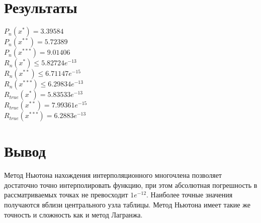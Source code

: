 \documentclass[10pt]{scrartcl}
\begin{document}
\section*{Результаты}\noindent
$P_n(x^*) = 3.39584$\\
$P_n(x^{**}) = 5.72389$\\
$P_n(x^{***})= 9.01406$\\
$R_n(x^*) \leq 5.82724e^{-13}$\\
$R_n(x^{**}) \leq 6.71147e^{-15}$\\
$R_n(x^{***}) \leq 6.29834e^{-13}$\\
$R_{true}(x^*) = 5.83533e^{-13}$\\
$R_{true}(x^{**}) = 7.99361e^{-15}$\\
$R_{true}(x^{***}) = 6.2883e^{-13}$\\
\section*{Вывод}\noindent
Метод Ньютона нахождения интерполяционного многочлена позволяет достаточно точно интерполировать
функцию, при этом абсолютная погрешность в рассматриваемых точках не превосходит $1e^{-12}$. Наиболее 
точные значения получаются вблизи центрального узла таблицы. Метод Ньютона имеет такие же точность и 
сложность как и метод Лагранжа.
\end{document}
